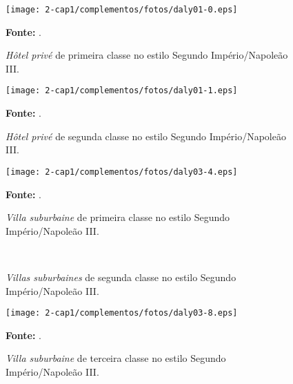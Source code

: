 \begin{figure}[!htp]
\centering
\texttt{[image: 2-cap1/complementos/fotos/daly01-0.eps]}{\par \footnotesize \textbf{Fonte:} . \par}
\label{fig:hotelprimclas} 
\caption{\textit{Hôtel privé} de primeira classe no estilo Segundo Império/Napoleão III.}
\end{figure}

\begin{figure}[!htp]
\centering
\texttt{[image: 2-cap1/complementos/fotos/daly01-1.eps]}{\par \footnotesize \textbf{Fonte:} . \par}
\label{fig:hotelsegclas} 
\caption{\textit{Hôtel privé} de segunda classe no estilo Segundo Império/Napoleão III.} 
\end{figure}

\begin{figure}[!htp]
\centering
\texttt{[image: 2-cap1/complementos/fotos/daly03-4.eps]}{\par \footnotesize \textbf{Fonte:} . \par}
\label{fig:villaprimclas} 
\caption{\textit{Villa suburbaine} de primeira classe no estilo Segundo Império/Napoleão III.}
\end{figure}

\begin{figure}[!htp]
\centering
{}
\  %
\caption{\textit{Villas suburbaines} de segunda classe no estilo Segundo Império/Napoleão III.}
\end{figure}

\begin{figure}[!htp]
\centering
\texttt{[image: 2-cap1/complementos/fotos/daly03-8.eps]}{\par \footnotesize \textbf{Fonte:} . \par}
\label{fig:villaprimclas} 
\caption{\textit{Villa suburbaine} de terceira classe no estilo Segundo Império/Napoleão III.}
\end{figure}

